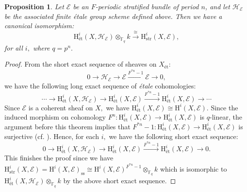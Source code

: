 \documentclass[12pt,a4]{amsart}
\newtheorem{prop}[claim]{Proposition}
\theoremstyle{definition}
\begin{document}
\begin{prop} \label{etale comparison}
Let \(\mathcal E\) be an \(F\)-periodic stratified bundle of period \(n\), and let
\(\mathcal H_{\mathcal E}\) be the associated finite \'{e}tale group scheme defined above. Then we have a canonical isomorphism:
$$\mathrm H^i_\text{\'et}(X, \mathcal H_{\mathcal E}) \otimes_{\mathbb{F}_q} k \xrightarrow{\cong} \mathrm H^i_\mathrm{str}(X, \mathcal E),$$ for all $i,$ where $q = p^n.$
\end{prop}
\begin{proof}
From the short exact sequence of sheaves on $X_\text{\'et}:$ 
$$0 \rightarrow \mathcal H_{\mathcal E} \rightarrow\mathcal E  \xrightarrow{F^{*n}-1} 
\mathcal E  \rightarrow 0,$$
we have the following long exact sequence of \textit{\'etale} cohomologies:
\begin{equation}
\cdots \rightarrow\mathrm  H^i_\text{\'et}(X, \mathcal H_{\mathcal E}) 
\rightarrow\mathrm  H^i_\text{\'et}(X,\mathcal E) \xrightarrow{F^{*n}-1}
\mathrm  H^i_\text{\'et}(X, \mathcal E) \rightarrow \cdots
\end{equation}
Since $\mathcal E$ is a coherent sheaf on $X,$ we have 
$\mathrm H^i_\text{\'et}(X, \mathcal E) \cong \mathrm H^i(X, \mathcal E).$ 
Since the induced morphism on cohomology 
$F^n:\mathrm H^i_\text{\'et}(X, \mathcal E)  \rightarrow 
\mathrm  H^i_\text{\'et}(X, \mathcal E)$ 
is $q$-linear, the argument before this theorem implies that 
$F^{*n}-1: \mathrm  H^i_\text{\'et}(X,\mathcal  E)  \rightarrow 
\mathrm  H^i_\text{\'et}(X,\mathcal  E)$ is surjective
 (cf. \cite[Proposition~1.2]{Kat69}). 
Hence, for each $i,$ we have the following short exact sequence:
$$ 0 \rightarrow \mathrm  H^i_\text{\'et}(X,\mathcal H_{\mathcal E}) \rightarrow 
\mathrm H^i_\text{\'et}(X,\mathcal E)  \xrightarrow{F^{*n}-1} 
\mathrm  H^i_\text{\'et}(X,\mathcal E) \rightarrow 0.$$
This finishes the proof since we have 
$\mathrm H^i_\mathrm{str}(X, \mathcal E) =\mathrm  H^i(X, \mathcal E)_\mathrm{ss} \cong
\mathrm  H^i(X, \mathcal E)^{F^{*n}-1}
 \otimes_{\mathbb F_q}k $ which is isomorphic to 
$\mathrm  H^i_\text{\'et}(X, \mathcal H_{\mathcal E}) \otimes_{\mathbb F_q}k$ by the above short exact sequence.
\end{proof}
\end{document}
